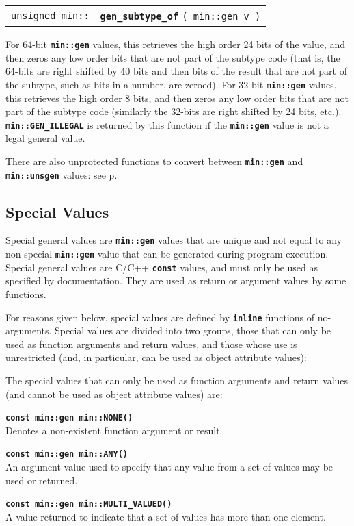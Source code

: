 \documentclass[12pt]{article}
\makeatletter
\newcommand{\TT}[1]{{\tt \bfseries #1}}
\newcommand{\ttindex}[1]{\index{#1@{\tt #1}}}
\newcommand{\pagref}[1]{p\pageref{#1}}
\newcommand{\EOL}{\penalty \exhyphenpenalty}
\newenvironment{indpar}[1][0.3in]%
	{\begin{list}{}%
		     {\setlength{\itemsep}{0in}%
		      \setlength{\topsep}{0in}%
		      \setlength{\parsep}{1ex}%
		      \setlength{\labelwidth}{#1}%
		      \setlength{\leftmargin}{#1}%
		      \addtolength{\leftmargin}{\labelsep}}%
	 \item}%
	{\end{list}}
\newcommand{\LABEL}[1]{\label{#1}}
\newcommand{\MINKEY}[1]%
	   {\TT{#1}\ttindex{min::#1}\ttindex{#1}}
\makeatother
\begin{document}
\begin{indpar}\begin{tabular}{r@{}l}
\verb|unsigned min::| & \MINKEY{gen\_subtype\_of} \verb|( min::gen v )|
\LABEL{MIN::GEN_SUBTYPE_OF} \\
\end{tabular}\end{indpar}

For 64-bit \TT{min::gen} values, this retrieves the high order
24 bits of the value, and then zeros any low order bits that are not
part of the subtype code (that is, the 64-bits are right shifted by
40 bits and then bits of the result that are not part of the
subtype, such as bits in a number, are zeroed).
For 32-bit \TT{min::gen} values, this retrieves
the high order 8 bits, and then zeros any low order bits that are not
part of the subtype code (similarly the 32-bits are right shifted by
24 bits, etc.).
\TT{min::GEN\_ILLEGAL} is returned by this function if the \TT{min::gen}
value is not a legal general value.

There are also unprotected functions to convert between
\TT{min::\EOL gen} and \TT{min::\EOL unsgen} values:
see \pagref{MUP::NEW_GEN}.

\subsection{Special Values}
\label{SPECIAL-VALUES}

Special general values are \TT{min::gen} values that are unique
and not equal to any non-special \TT{min::\EOL gen}
value that can be generated during
program execution.  Special general values are C/C++ \TT{const}
values, and must only be used as specified by documentation.
They are used as return or argument values by some functions.

For reasons given below, special values are defined by \TT{inline}
functions of no-arguments.  Special values are divided into two
groups, those that can only be used as function arguments and return
values, and those whose use is unrestricted (and, in particular, can be used
as object attribute values):

The special values that can only be used as function arguments and
return values (and \underline{cannot} be used as object attribute values)
are:\label{ATTR-ILLEGAL-SPECIAL-VALUES}

\begin{indpar}
\begin{list}{}{}
\item[\TT{const min::gen min::}\MINKEY{NONE()}]~%
	\LABEL{MIN::NONE}\\
Denotes a non-existent function argument or result.
\item[\TT{const min::gen min::}\MINKEY{ANY()}]~%
	\LABEL{MIN::ANY}\\
An argument value used to specify that any value from a set of values may be
used or returned.
\item[\TT{const min::gen min::}\MINKEY{MULTI\_VALUED()}]~%
	\LABEL{MIN::MULTI_VALUED}\\
A value returned to indicate that
a set of values has more than one element.
\end{list}
\end{indpar}
\end{document}
